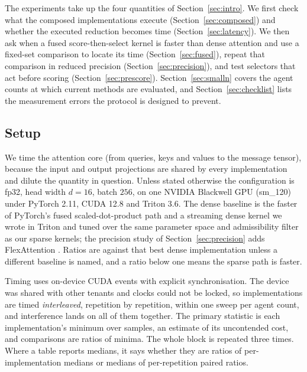 The experiments take up the four quantities of Section~\ref{sec:intro}. We
first check what the composed implementations execute
(Section~\ref{sec:composed}) and whether the executed reduction becomes time
(Section~\ref{sec:latency}). We then ask when a fused score-then-select kernel
is faster than dense attention and use a fixed-set comparison to locate its
time (Section~\ref{sec:fused}), repeat that comparison in reduced precision
(Section~\ref{sec:precision}), and test selectors that act before scoring
(Section~\ref{sec:prescore}). Section~\ref{sec:smalln} covers the agent counts
at which current methods are evaluated, and Section~\ref{sec:checklist} lists
the measurement errors the protocol is designed to prevent.

\subsection{Setup}
\label{sec:setup}

We time the attention core (from queries, keys and values to the message
tensor), because the input and output projections are shared by every
implementation and dilute the quantity in question. Unless stated otherwise the
configuration is fp32, head width $d{=}16$, batch $256$, on one NVIDIA
Blackwell GPU (sm\_120) under PyTorch 2.11, CUDA 12.8 and Triton 3.6. The dense
baseline is the faster of PyTorch's fused scaled-dot-product path and a
streaming dense kernel we wrote in Triton and tuned over the same parameter
space and admissibility filter as our sparse kernels; the precision study of
Section~\ref{sec:precision} adds FlexAttention \citep{dong2025flexattention}.
Ratios are against that best dense implementation unless a different baseline
is named, and a ratio below one means the sparse path is faster.

Timing uses on-device CUDA events with explicit synchronisation. The device was
shared with other tenants and clocks could not be locked, so implementations
are timed \emph{interleaved}, repetition by repetition, within one sweep per
agent count, and interference lands on all of them together. The primary
statistic is each implementation's minimum over samples, an estimate of its
uncontended cost, and comparisons are ratios of minima. The whole block is
repeated three times. Where a table reports medians, it says whether they are
ratios of per-implementation medians or medians of per-repetition paired ratios.

